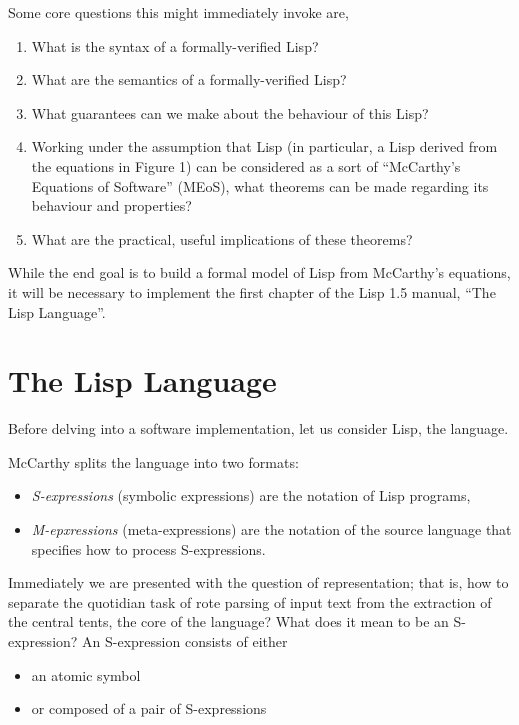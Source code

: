 \documentclass[10pt]{article}
\begin{document}
Some core questions this might immediately invoke are,

\begin{enumerate}
  \item What is the syntax of a formally-verified Lisp?
  \item What are the semantics of a formally-verified Lisp?
  \item What guarantees can we make about the behaviour of this Lisp?
  \item Working under the assumption that Lisp (in particular, a Lisp
    derived from the equations in Figure 1) can be considered as a
    sort of ``McCarthy's Equations of Software'' (MEoS), what theorems
    can be made regarding its behaviour and properties?
  \item What are the practical, useful implications of these theorems?
\end{enumerate}

While the end goal is to build a formal model of Lisp from McCarthy's
equations, it will be necessary to implement the first chapter of the
Lisp 1.5 manual, ``The Lisp Language''.

\section{The Lisp Language}

Before delving into a software implementation, let us consider Lisp,
the language.

McCarthy splits the language into two formats:

\begin{itemize}

\item \emph{S-expressions} (symbolic expressions) are the notation of
  Lisp programs,

\item \emph{M-epxressions} (meta-expressions) are the notation of the
  source language that specifies how to process S-expressions.

\end{itemize}

Immediately we are presented with the question of representation; that
is, how to separate the quotidian task of rote parsing of input text
from the extraction of the central tents, the core of the language?
What does it mean to be an S-expression? An S-expression consists of
either

\begin{itemize}
  \item an atomic symbol
  \item or composed of a pair of S-expressions
\end{itemize}
\end{document}
